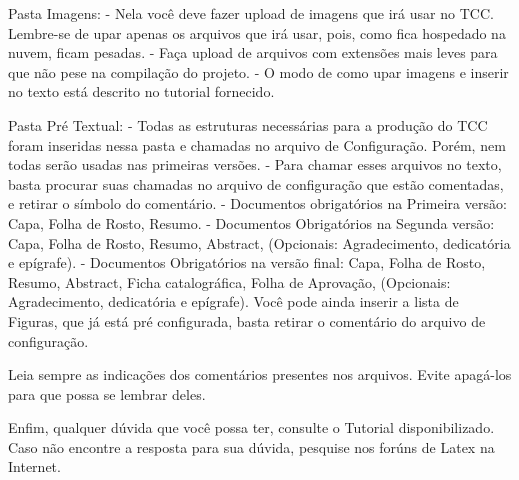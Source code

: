 Pasta Imagens:
- Nela você deve fazer upload de imagens que irá usar no TCC. Lembre-se de upar apenas os arquivos que irá usar, pois, como fica hospedado na nuvem, ficam pesadas.
- Faça upload de arquivos com extensões mais leves para que não pese na compilação do projeto.
- O modo de como upar imagens e inserir no texto está descrito no tutorial fornecido.

Pasta Pré Textual:
- Todas as estruturas necessárias para a produção do TCC foram inseridas nessa pasta e chamadas no arquivo de Configuração. Porém, nem todas serão usadas nas primeiras versões.
- Para chamar esses arquivos no texto, basta procurar suas chamadas no arquivo de configuração que estão comentadas, e retirar o símbolo do comentário.
- Documentos obrigatórios na Primeira versão: Capa, Folha de Rosto, Resumo.
- Documentos Obrigatórios na Segunda versão: Capa, Folha de Rosto, Resumo, Abstract, (Opcionais: Agradecimento, dedicatória e epígrafe).
- Documentos Obrigatórios na  versão final: Capa, Folha de Rosto, Resumo, Abstract, Ficha catalográfica, Folha de Aprovação,  (Opcionais: Agradecimento, dedicatória e epígrafe). Você pode ainda inserir a lista de Figuras, que já está pré configurada, basta retirar o comentário do arquivo de configuração.

Leia sempre as indicações dos comentários presentes nos arquivos. Evite apagá-los para que possa se lembrar deles.

Enfim, qualquer dúvida que você possa ter, consulte o Tutorial disponibilizado. Caso não encontre a resposta para sua dúvida, pesquise nos forúns de Latex na Internet.








